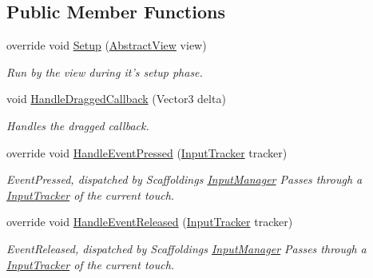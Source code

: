 \subsection*{Public Member Functions}
\begin{DoxyCompactItemize}
\item 
override void \hyperlink{class_scaffolding_1_1_drag_this_input_afb612ddc8d089c8708494b57063b235d}{Setup} (\hyperlink{class_scaffolding_1_1_abstract_view}{Abstract\-View} view)
\begin{DoxyCompactList}\small\item\em Run by the view during it's setup phase. \end{DoxyCompactList}\item 
void \hyperlink{class_scaffolding_1_1_drag_this_input_a5de83a69a0b5052b9d162dcf397e5684}{Handle\-Dragged\-Callback} (Vector3 delta)
\begin{DoxyCompactList}\small\item\em Handles the dragged callback. \end{DoxyCompactList}\item 
override void \hyperlink{class_scaffolding_1_1_drag_this_input_a09639007081a6fee7bb7141ec5fa32a5}{Handle\-Event\-Pressed} (\hyperlink{class_scaffolding_1_1_input_tracker}{Input\-Tracker} tracker)
\begin{DoxyCompactList}\small\item\em Event\-Pressed, dispatched by Scaffoldings \hyperlink{class_scaffolding_1_1_input_manager}{Input\-Manager} Passes through a \hyperlink{class_scaffolding_1_1_input_tracker}{Input\-Tracker} of the current touch. \end{DoxyCompactList}\item 
override void \hyperlink{class_scaffolding_1_1_drag_this_input_a9da2ff31ce625e9880e6f47cd8617c6a}{Handle\-Event\-Released} (\hyperlink{class_scaffolding_1_1_input_tracker}{Input\-Tracker} tracker)
\begin{DoxyCompactList}\small\item\em Event\-Released, dispatched by Scaffoldings \hyperlink{class_scaffolding_1_1_input_manager}{Input\-Manager} Passes through a \hyperlink{class_scaffolding_1_1_input_tracker}{Input\-Tracker} of the current touch. \end{DoxyCompactList}\end{DoxyCompactItemize}
